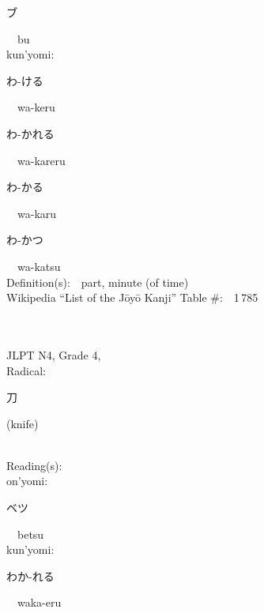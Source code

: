 \begin{multicols}{2}
{\hspace*{2em}}{\begin{CJK}{UTF8}{min} ブ \end{CJK}}\ \ bu\ \ \\
{\hspace*{1em}}kun'yomi:\ \ \\
{\hspace*{2em}}{\begin{CJK}{UTF8}{min} わ-ける \end{CJK}}\ \ wa-keru\ \ \\
{\hspace*{2em}}{\begin{CJK}{UTF8}{min} わ-かれる \end{CJK}}\ \ wa-kareru\ \ \\
{\hspace*{2em}}{\begin{CJK}{UTF8}{min} わ-かる \end{CJK}}\ \ wa-karu\ \ \\
{\hspace*{2em}}{\begin{CJK}{UTF8}{min} わ-かつ \end{CJK}}\ \ wa-katsu\ \ \\
Definition(s):\ \ part, minute (of time) \\
Wikipedia ``List of the J\=oy\=o Kanji'' Table \#:\ \ 1\,785 \\
\ \ \\
{\fontsize{34pt}{40pt}  }\ \ \\  %
{JLPT N4, Grade 4, \\Radical:\ \ {\begin{CJK}{UTF8}{min} 刀 \end{CJK}} (knife) } \\
Reading(s):\ \ \\
{\hspace*{1em}}on'yomi:\ \ \\
{\hspace*{2em}}{\begin{CJK}{UTF8}{min} ベツ \end{CJK}}\ \ betsu\ \ \\
{\hspace*{1em}}kun'yomi:\ \ \\
{\hspace*{2em}}{\begin{CJK}{UTF8}{min} わか-れる \end{CJK}}\ \ waka-eru\ \ \\

\end{multicols}
